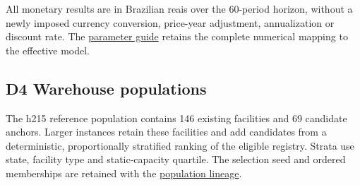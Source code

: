\documentclass[
  english,
  11pt,
  a4paper,
]{article}
\begin{document}
All monetary results are in Brazilian reais over the 60-period horizon,
without a newly imposed currency conversion, price-year adjustment,
annualization or discount rate. The
\href{https://github.com/unb-lamfo-or-ai-hpc/model-agrologistic/blob/1b54023f4e0c0c27aba64883b1e9cf25817ad0f8/docs/evidence/appendix_input_reproduction_20261028.json}{parameter
guide} retains the complete numerical mapping to the effective model.

\subsection{D4 Warehouse populations}\label{d4-warehouse-populations}

The h215 reference population contains 146 existing facilities and 69
candidate anchors. Larger instances retain these facilities and add
candidates from a deterministic, proportionally stratified ranking of
the eligible registry. Strata use state, facility type and
static-capacity quartile. The selection seed and ordered memberships are
retained with the
\href{https://github.com/unb-lamfo-or-ai-hpc/model-agrologistic/blob/1b54023f4e0c0c27aba64883b1e9cf25817ad0f8/docs/evidence/scalar_h300_population_lineage_20261020.json}{population
lineage}.
\end{document}

